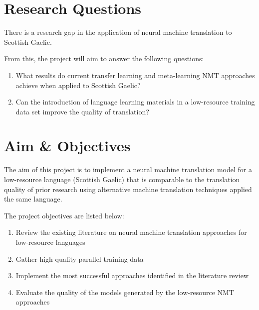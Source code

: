 \section{Research Questions}
There is a research gap in the application of neural machine translation to Scottish Gaelic.

From this, the project will aim to answer the following questions:

\begin{enumerate}
    \item What results do current transfer learning and meta-learning NMT approaches achieve when applied to Scottish Gaelic?
    \item Can the introduction of language learning materials in a low-resource training data set improve the quality of translation?
\end{enumerate}


\section{Aim \& Objectives}
The aim of this project is to implement a neural machine translation model for a low-resource language (Scottish Gaelic) that is comparable to the translation quality of prior research using alternative machine translation techniques applied the same language.

The project objectives are listed below:

\begin{enumerate}
  \item Review the existing literature on neural machine translation approaches for low-resource languages
  \item Gather high quality parallel training data
  \item Implement the most successful approaches identified in the literature review
  \item Evaluate the quality of the models generated by the low-resource NMT approaches
\end{enumerate}
